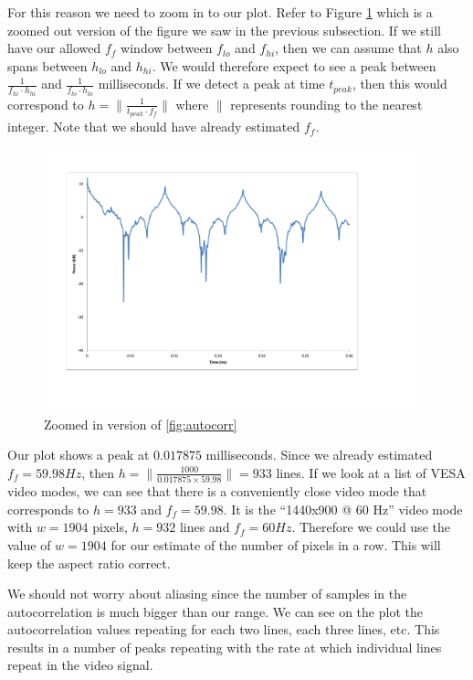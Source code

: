 \documentclass[a4paper,12pt,twoside,openright]{report}
\begin{document}
For this reason we need to zoom in to our plot. Refer to Figure \ref{fig:autocorr_zoomed} which is a zoomed out version of the figure we saw in the previous subsection. If we still have our allowed $f_{f}$ window between $f_{lo}$ and $f_{hi}$, then we can assume that $h$ also spans between $h_{lo}$ and $h_{hi}$. We would therefore expect to see a peak between $\frac{1}{f_{hi} \cdot h_{hi}}$ and $\frac{1}{f_{lo} \cdot h_{lo}}$ milliseconds. If we detect a peak at time $t_{peak}$, then this would correspond to $h = \| \frac{1}{t_{peak} \cdot f_{f}} \|$ where $\|$ represents rounding to the nearest integer. Note that we should have already estimated $f_{f}$.

\begin{figure}[h]
\centering
  \includegraphics[width=0.96\textwidth]{autocorr_zoomed}
  \caption{Zoomed in version of \ref{fig:autocorr}}
  \label{fig:autocorr_zoomed}
\end{figure}

Our plot shows a peak at $0.017875$ milliseconds. Since we already estimated $f_{f} = 59.98 Hz$, then $h = \| \frac{1000}{0.017875 \times 59.98} \| = 933$ lines. If we look at a list of VESA video modes, we can see that there is a conveniently close video mode that corresponds to $h = 933$ and $f_{f} = 59.98$. It is the ``1440x900 @ 60 Hz'' video mode with $w = 1904$ pixels, $h = 932$ lines and $f_{f}=60 Hz$. Therefore we could use the value of $w = 1904$ for our estimate of the number of pixels in a row. This will keep the aspect ratio correct.

We should not worry about aliasing since the number of samples in the autocorrelation is much bigger than our range. We can see on the plot the autocorrelation values repeating for each two lines, each three lines, etc. This results in a number of peaks repeating with the rate at which individual lines repeat in the video signal.
\end{document}
